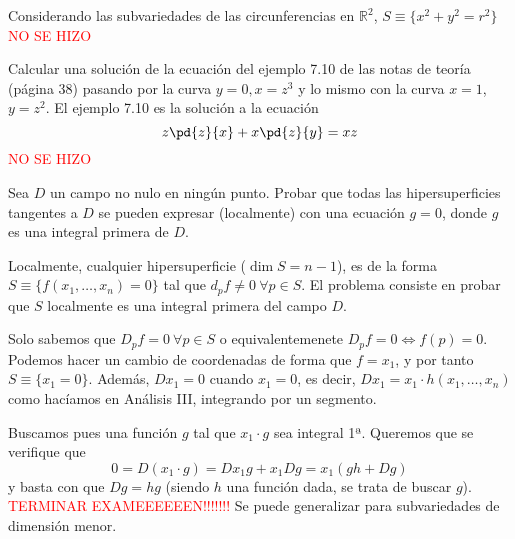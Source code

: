 \begin{sol}
    Considerando las subvariedades de las circunferencias en $\mathbb R^2$, $S \equiv \{x^2+y^2=r^2\}$ \textcolor{red}{NO SE HIZO}
\end{sol}
\begin{ejer}
    Calcular una solución de la ecuación del ejemplo 7.10 de las notas de teoría (página 38)  pasando por la curva $y=0, x=z^3$ y lo mismo con la curva $x=1$, $y=z^2$. El ejemplo 7.10 es la solución a la ecuación
    $$z \pd{z}{x} + x \pd{z}{y}=xz$$
    \textcolor{red}{NO SE HIZO}
\end{ejer}
\begin{ejer}
    Sea $D$ un campo no nulo en ningún punto. Probar que todas las hipersuperficies tangentes a $D$ se pueden expresar (localmente) con una ecuación $g=0$, donde $g$ es una integral primera de $D$.
\end{ejer}
\begin{sol}
    Localmente, cualquier hipersuperficie ($\dim S=n-1$), es de la forma $S \equiv \{f(x_1,\ldots,x_n)=0\}$ tal que $d_pf\neq 0 \: \forall p \in S$. El problema consiste en probar que $S$ localmente es una integral primera del campo $D$. 

    Solo sabemos que $D_pf=0 \: \forall p \in S$ o equivalentemenete $D_pf=0 \iff f(p)=0$. Podemos hacer un cambio de coordenadas de forma que $f=x_1$, y por tanto $S\equiv\{x_1=0\}$. Además, $Dx_1=0$ cuando $x_1=0$, es decir, $Dx_1=x_1 \cdot h(x_1,\ldots,x_n)$ como hacíamos en Análisis III, integrando por un segmento. 

    Buscamos pues una función $g$ tal que $x_1 \cdot g$ sea integral 1ª. Queremos que se verifique que 
    $$0=D(x_1 \cdot g)=Dx_1 g+ x_1 Dg=x_1( gh + Dg)$$
    y basta con que $Dg=hg$ (siendo $h$ una función dada, se trata de buscar $g$). \textcolor{red}{TERMINAR EXAMEEEEEEN!!!!!!!} Se puede generalizar para subvariedades de dimensión menor.
\end{sol}

